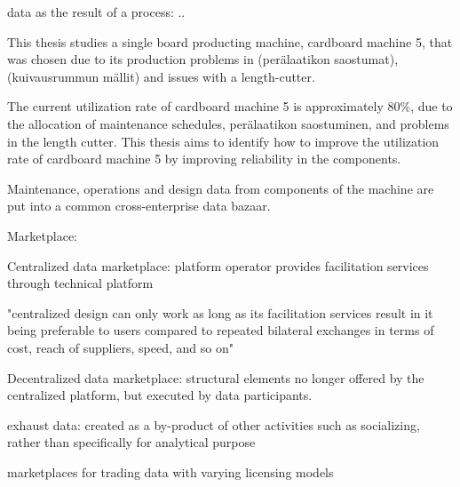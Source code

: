data as the result of a process: 
..





This thesis studies a single board producting machine, cardboard machine 5, that was chosen due to its production problems in (perälaatikon saostumat), (kuivausrummun mällit) and issues with a length-cutter. 


The current utilization rate of cardboard machine 5 is approximately 80\%, due to the allocation of maintenance schedules, perälaatikon saostuminen, and problems in the length cutter. This thesis aims to identify how to improve the utilization rate of cardboard machine 5 by improving reliability in the components. 



Maintenance, operations and design data from components of the machine are put into a common cross-enterprise data bazaar. 








Marketplace:


\cite{Aijan paperi} Centralized data marketplace:
platform operator provides facilitation services through technical platform

"centralized design can only work as long as its facilitation services result in it being preferable to users compared to repeated bilateral exchanges in terms of cost, reach of suppliers, speed, and so on"

Decentralized data marketplace: structural elements no longer offered by the centralized platform, but executed by data participants.


exhaust data: created as a by-product of other activities such as socializing, rather than specifically for analytical purpose

\cite{schomm2013marketplaces} marketplaces for trading data with varying licensing models










